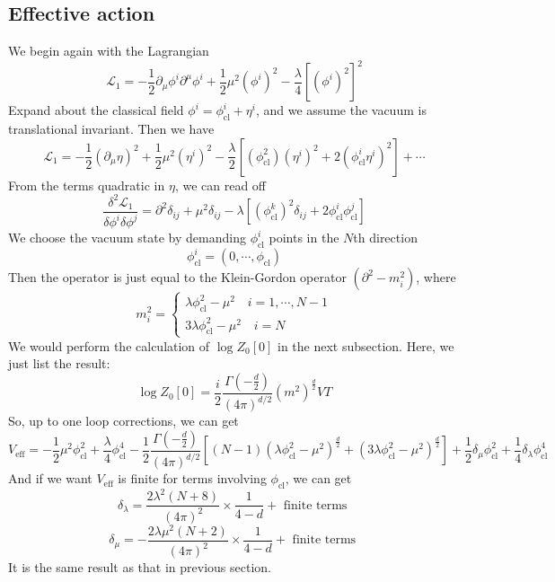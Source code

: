 \subsection{Effective action}
We begin again with the Lagrangian
\[\mathcal{L}_1 = -\frac{1}{2} \partial_{\mu} \phi^i \partial^{\mu}\phi^i + \frac{1}{2} \mu^2 (\phi^i)^2 - \frac{\lambda}{4} [(\phi^i)^2]^2\]
Expand about the classical field $\phi^i = \phi_{\mathrm{cl}}^i + \eta^i$, and we assume the vacuum is translational invariant. Then we have
\[\mathcal{L}_1 = -\frac{1}{2}(\partial_{\mu}\eta)^2 + \frac{1}{2}\mu^2(\eta^i)^2 - \frac{\lambda}{2}[(\phi_{\mathrm{cl}}^2)(\eta^i)^2+ 2(\phi_{\mathrm{cl}}^i\eta^i)^2] + \cdots\]
From the terms quadratic in $\eta$, we can read off
\[\frac{\delta^2 \mathcal{L}_1}{\delta\phi^i\delta\phi^j} = \partial^2\delta_{ij} + \mu^2\delta_{ij} - \lambda[(\phi_{\mathrm{cl}}^k)^2\delta_{ij} + 2\phi_{\mathrm{cl}}^i \phi_{\mathrm{cl}}^j]\]
We choose the vacuum state by demanding $\phi_{\mathrm{cl}}^i$ points in the $N$th direction
\[\phi_{\mathrm{cl}}^i = (0,\cdots,\phi_{\mathrm{cl}})\]
Then the operator is just equal to the Klein-Gordon operator $(\partial^2-m_i^2)$, where
\[m_i^2 = \begin{cases} \lambda\phi_{\mathrm{cl}}^2-\mu^2 \quad i=1,\cdots,N-1 \\ 3\lambda\phi_{\mathrm{cl}}^2-\mu^2 \quad i=N \end{cases}\]
We would perform the calculation of $\log Z_0[0]$ in the next subsection. Here, we just list the result:
\[\log Z_0[0] = \frac{i}{2}\frac{\Gamma(-\frac{d}{2})}{(4\pi)^{d/2}}(m^2)^{\frac{d}{2}}VT\]
So, up to one loop corrections, we can get
\[V_{\mathrm{eff}} = -\frac{1}{2} \mu^2 \phi_{\mathrm{cl}}^2 + \frac{\lambda}{4} \phi_{\mathrm{cl}}^4 - \frac{1}{2}\frac{\Gamma(-\frac{d}{2})}{(4\pi)^{d/2}}[(N-1)(\lambda\phi_{\mathrm{cl}}^2-\mu^2)^{\frac{d}{2}} + (3\lambda\phi_{\mathrm{cl}}^2-\mu^2)^{\frac{d}{2}}] + \frac{1}{2}\delta_{\mu}\phi_{\mathrm{cl}}^2 + \frac{1}{4}\delta_{\lambda}\phi_{\mathrm{cl}}^4\]
And if we want $V_{\mathrm{eff}}$ is finite for terms involving $\phi_{\mathrm{cl}}$, we can get
\[\delta_{\lambda} = \frac{2\lambda^2(N+8)}{(4\pi)^2} \times \frac{1}{4-d} + \mbox{ finite terms }\]
\[\delta_{\mu} = -\frac{2\lambda\mu^2(N+2)}{(4\pi)^2} \times \frac{1}{4-d} + \mbox{ finite terms }\]
It is the same result as that in previous section.

